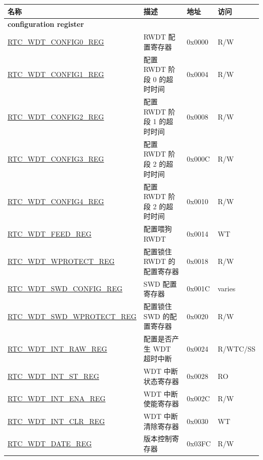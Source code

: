\begin{longtable}{ | p{6cm} | p{7.2cm} | p{1.3cm} | p{1cm} | }
\hline\rowcolor{lightgray}
\textbf{名称 } & \textbf{描述} &  \textbf{地址} & \textbf{访问} \\ \hline
\endhead
\multicolumn{4}{|l|}{\textbf{configuration register}} \\ \hline
\hyperref[regdesc:RTCWDTCONFIG0REG]{RTC\_WDT\_CONFIG0\_REG} & RWDT 配置寄存器 & 0x0000 & R/W \\ \hline
\hyperref[regdesc:RTCWDTCONFIG1REG]{RTC\_WDT\_CONFIG1\_REG} & 配置 RWDT 阶段 0 的超时时间 & 0x0004 & R/W \\ \hline
\hyperref[regdesc:RTCWDTCONFIG2REG]{RTC\_WDT\_CONFIG2\_REG} & 配置 RWDT 阶段 1 的超时时间 & 0x0008 & R/W \\ \hline
\hyperref[regdesc:RTCWDTCONFIG3REG]{RTC\_WDT\_CONFIG3\_REG} & 配置 RWDT 阶段 2 的超时时间 & 0x000C & R/W \\ \hline
\hyperref[regdesc:RTCWDTCONFIG4REG]{RTC\_WDT\_CONFIG4\_REG} & 配置 RWDT 阶段 2 的超时时间 & 0x0010 & R/W \\ \hline
\hyperref[regdesc:RTCWDTFEEDREG]{RTC\_WDT\_FEED\_REG} & 配置喂狗 RWDT & 0x0014 & WT \\ \hline
\hyperref[regdesc:RTCWDTWPROTECTREG]{RTC\_WDT\_WPROTECT\_REG} & 配置锁住 RWDT 的配置寄存器 & 0x0018 & R/W \\ \hline
\hyperref[regdesc:RTCWDTSWDCONFIGREG]{RTC\_WDT\_SWD\_CONFIG\_REG} & SWD 配置寄存器 & 0x001C & varies \\ \hline
\hyperref[regdesc:RTCWDTSWDWPROTECTREG]{RTC\_WDT\_SWD\_WPROTECT\_REG} & 配置锁住 SWD 的配置寄存器 & 0x0020 & R/W \\ \hline
\hyperref[regdesc:RTCWDTINTRAWREG]{RTC\_WDT\_INT\_RAW\_REG} & 配置是否产生 WDT 超时中断 & 0x0024 & R/WTC/SS \\ \hline
\hyperref[regdesc:RTCWDTINTSTREG]{RTC\_WDT\_INT\_ST\_REG} & WDT 中断状态寄存器 & 0x0028 & RO \\ \hline
\hyperref[regdesc:RTCWDTINTENAREG]{RTC\_WDT\_INT\_ENA\_REG} & WDT 中断使能寄存器 & 0x002C & R/W \\ \hline
\hyperref[regdesc:RTCWDTINTCLRREG]{RTC\_WDT\_INT\_CLR\_REG} & WDT 中断清除寄存器 & 0x0030 & WT \\ \hline
\hyperref[regdesc:RTCWDTDATEREG]{RTC\_WDT\_DATE\_REG} & 版本控制寄存器 & 0x03FC & R/W \\ \hline
\end{longtable}

